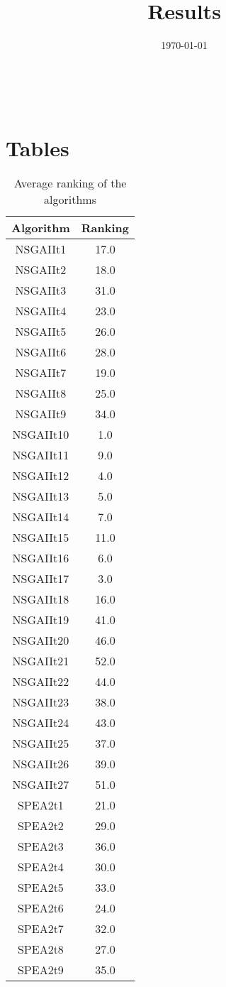 \documentclass{article}
\title{Results}
\author{}
\date{\today}
\begin{document}
\oddsidemargin 0in \topmargin 0in\maketitle
\
\section{Tables}
\begin{table}[!htp]
\centering
\caption{Average ranking of the algorithms}
\begin{tabular}{c|c}
Algorithm&Ranking\\
\hline
NSGAIIt1&17.0\\
NSGAIIt2&18.0\\
NSGAIIt3&31.0\\
NSGAIIt4&23.0\\
NSGAIIt5&26.0\\
NSGAIIt6&28.0\\
NSGAIIt7&19.0\\
NSGAIIt8&25.0\\
NSGAIIt9&34.0\\
NSGAIIt10&1.0\\
NSGAIIt11&9.0\\
NSGAIIt12&4.0\\
NSGAIIt13&5.0\\
NSGAIIt14&7.0\\
NSGAIIt15&11.0\\
NSGAIIt16&6.0\\
NSGAIIt17&3.0\\
NSGAIIt18&16.0\\
NSGAIIt19&41.0\\
NSGAIIt20&46.0\\
NSGAIIt21&52.0\\
NSGAIIt22&44.0\\
NSGAIIt23&38.0\\
NSGAIIt24&43.0\\
NSGAIIt25&37.0\\
NSGAIIt26&39.0\\
NSGAIIt27&51.0\\
SPEA2t1&21.0\\
SPEA2t2&29.0\\
SPEA2t3&36.0\\
SPEA2t4&30.0\\
SPEA2t5&33.0\\
SPEA2t6&24.0\\
SPEA2t7&32.0\\
SPEA2t8&27.0\\
SPEA2t9&35.0\\

\end{tabular}
\end{table}
\end{document}
